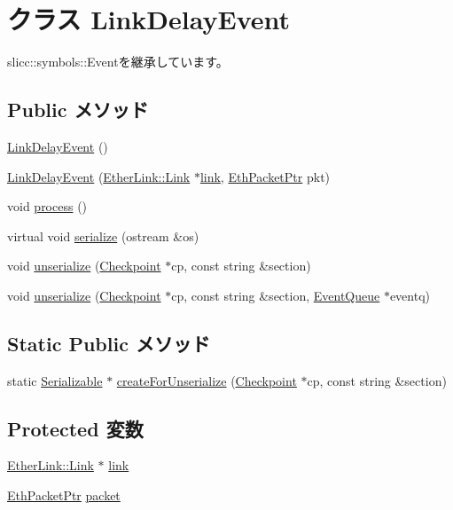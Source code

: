 \hypertarget{classLinkDelayEvent}{
\section{クラス LinkDelayEvent}
\label{classLinkDelayEvent}
}


slicc::symbols::Eventを継承しています。\subsection*{Public メソッド}
\begin{DoxyCompactItemize}
\item 
\hyperlink{classLinkDelayEvent_a2400590674c0101699e99de9ce8838b0}{LinkDelayEvent} ()
\item 
\hyperlink{classLinkDelayEvent_ad1183c43a76f885b87e4ba68c8134922}{LinkDelayEvent} (\hyperlink{classEtherLink_1_1Link}{EtherLink::Link} $\ast$\hyperlink{classLinkDelayEvent_ad5879df04b868c303ab79e3098fe1627}{link}, \hyperlink{classRefCountingPtr}{EthPacketPtr} pkt)
\item 
void \hyperlink{classLinkDelayEvent_a2e9c5136d19b1a95fc427e0852deab5c}{process} ()
\item 
virtual void \hyperlink{classLinkDelayEvent_a21e39b74fa4d4676016935883b644bc4}{serialize} (ostream \&os)
\item 
void \hyperlink{classLinkDelayEvent_a7aaf1d4989130c720a8eb3af7e6068de}{unserialize} (\hyperlink{classCheckpoint}{Checkpoint} $\ast$cp, const string \&section)
\item 
void \hyperlink{classLinkDelayEvent_aa47cff31a391937b0975fee5a5e53eba}{unserialize} (\hyperlink{classCheckpoint}{Checkpoint} $\ast$cp, const string \&section, \hyperlink{classEventQueue}{EventQueue} $\ast$eventq)
\end{DoxyCompactItemize}
\subsection*{Static Public メソッド}
\begin{DoxyCompactItemize}
\item 
static \hyperlink{classSerializable}{Serializable} $\ast$ \hyperlink{classLinkDelayEvent_a6507efe5036b34b31ad311eaf7cd6ba9}{createForUnserialize} (\hyperlink{classCheckpoint}{Checkpoint} $\ast$cp, const string \&section)
\end{DoxyCompactItemize}
\subsection*{Protected 変数}
\begin{DoxyCompactItemize}
\item 
\hyperlink{classEtherLink_1_1Link}{EtherLink::Link} $\ast$ \hyperlink{classLinkDelayEvent_ad5879df04b868c303ab79e3098fe1627}{link}
\item 
\hyperlink{classRefCountingPtr}{EthPacketPtr} \hyperlink{classLinkDelayEvent_a8bd0d3f7eb9e8d7189c7027028a5fac0}{packet}
\end{DoxyCompactItemize}


